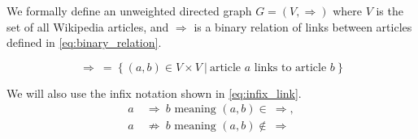 We formally define an unweighted directed graph $G = (V,\Rightarrow)$ where $V$ is the set of all Wikipedia articles, and $\Rightarrow$ is a binary relation of links between articles defined in \cref{eq:binary_relation}.

\begin{equation}
\label{eq:binary_relation}
\Rightarrow\ =\ \{\ (a,b) \in V \times V\ |\ \text{article } a \text{ links to article } b\ \}
\end{equation}

We will also use the infix notation shown in \cref{eq:infix_link}.
\begin{equation}
\label{eq:infix_link}
  \begin{split}
    a\ & \Rightarrow\ b \text{ meaning } (a,b) \in\ \Rightarrow,\\
    a\ & \not\Rightarrow\ b \text{ meaning } (a,b) \not\in\ \Rightarrow
  \end{split}
\end{equation}


